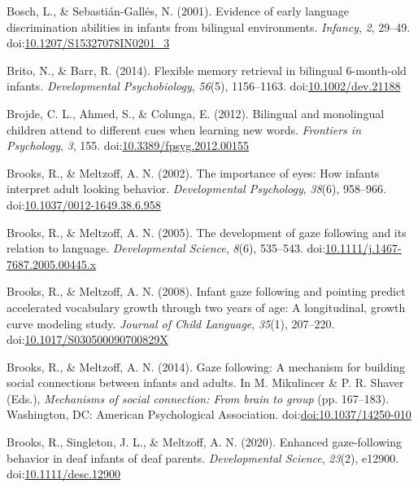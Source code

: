 \documentclass[,man,floatsintext]{apa6}
\begin{document}
\leavevmode\hypertarget{ref-Bosch_Sebastian-Galles_2001}{}%
Bosch, L., \& Sebastián-Gallés, N. (2001). Evidence of early language discrimination abilities in infants from bilingual environments. \emph{Infancy}, \emph{2}, 29--49. doi:\href{https://doi.org/10.1207/S15327078IN0201_3}{10.1207/S15327078IN0201\_3}

\leavevmode\hypertarget{ref-Brito_Barr_2014}{}%
Brito, N., \& Barr, R. (2014). Flexible memory retrieval in bilingual 6-month-old infants. \emph{Developmental Psychobiology}, \emph{56}(5), 1156--1163. doi:\href{https://doi.org/10.1002/dev.21188}{10.1002/dev.21188}

\leavevmode\hypertarget{ref-Brojde_etal_2012}{}%
Brojde, C. L., Ahmed, S., \& Colunga, E. (2012). Bilingual and monolingual children attend to different cues when learning new words. \emph{Frontiers in Psychology}, \emph{3}, 155. doi:\href{https://doi.org/10.3389/fpsyg.2012.00155}{10.3389/fpsyg.2012.00155}

\leavevmode\hypertarget{ref-Brooks_Meltzoff_2002}{}%
Brooks, R., \& Meltzoff, A. N. (2002). The importance of eyes: How infants interpret adult looking behavior. \emph{Developmental Psychology}, \emph{38}(6), 958--966. doi:\href{https://doi.org/10.1037/0012-1649.38.6.958}{10.1037/0012-1649.38.6.958}

\leavevmode\hypertarget{ref-Brooks_Meltzoff_2005}{}%
Brooks, R., \& Meltzoff, A. N. (2005). The development of gaze following and its relation to language. \emph{Developmental Science}, \emph{8}(6), 535--543. doi:\href{https://doi.org/10.1111/j.1467-7687.2005.00445.x}{10.1111/j.1467-7687.2005.00445.x}

\leavevmode\hypertarget{ref-Brooks_Meltzoff_2008}{}%
Brooks, R., \& Meltzoff, A. N. (2008). Infant gaze following and pointing predict accelerated vocabulary growth through two years of age: A longitudinal, growth curve modeling study. \emph{Journal of Child Language}, \emph{35}(1), 207--220. doi:\href{https://doi.org/10.1017/S030500090700829X}{10.1017/S030500090700829X}

\leavevmode\hypertarget{ref-Brooks_Meltzoff_2014}{}%
Brooks, R., \& Meltzoff, A. N. (2014). Gaze following: A mechanism for building social connections between infants and adults. In M. Mikulincer \& P. R. Shaver (Eds.), \emph{Mechanisms of social connection: From brain to group} (pp. 167--183). Washington, DC: American Psychological Association. doi:\href{https://doi.org/doi:10.1037/14250-010}{doi:10.1037/14250-010}

\leavevmode\hypertarget{ref-Brooks_etal_2020}{}%
Brooks, R., Singleton, J. L., \& Meltzoff, A. N. (2020). Enhanced gaze-following behavior in deaf infants of deaf parents. \emph{Developmental Science}, \emph{23}(2), e12900. doi:\href{https://doi.org/10.1111/desc.12900}{10.1111/desc.12900}
\end{document}
